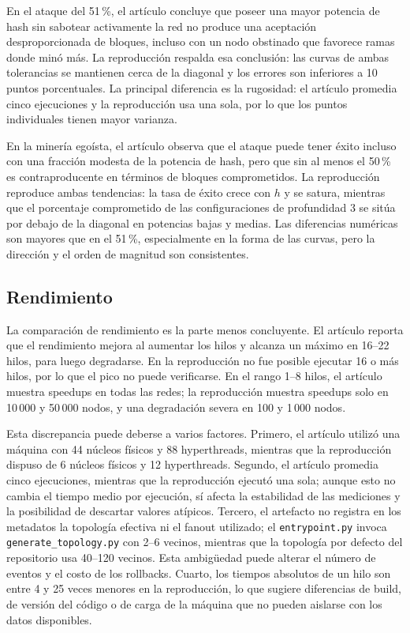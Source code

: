 \documentclass[11pt,a4paper,oneside]{article}
\begin{document}
En el ataque del 51\,\%, el artículo concluye que poseer una mayor potencia de hash sin sabotear activamente la red no produce una aceptación desproporcionada de bloques, incluso con un nodo obstinado que favorece ramas donde minó más. La reproducción respalda esa conclusión: las curvas de ambas tolerancias se mantienen cerca de la diagonal y los errores son inferiores a 10 puntos porcentuales. La principal diferencia es la rugosidad: el artículo promedia cinco ejecuciones y la reproducción usa una sola, por lo que los puntos individuales tienen mayor varianza.

En la minería egoísta, el artículo observa que el ataque puede tener éxito incluso con una fracción modesta de la potencia de hash, pero que sin al menos el 50\,\% es contraproducente en términos de bloques comprometidos. La reproducción reproduce ambas tendencias: la tasa de éxito crece con $h$ y se satura, mientras que el porcentaje comprometido de las configuraciones de profundidad 3 se sitúa por debajo de la diagonal en potencias bajas y medias. Las diferencias numéricas son mayores que en el 51\,\%, especialmente en la forma de las curvas, pero la dirección y el orden de magnitud son consistentes.

\subsection{Rendimiento}

La comparación de rendimiento es la parte menos concluyente. El artículo reporta que el rendimiento mejora al aumentar los hilos y alcanza un máximo en 16--22 hilos, para luego degradarse. En la reproducción no fue posible ejecutar 16 o más hilos, por lo que el pico no puede verificarse. En el rango 1--8 hilos, el artículo muestra speedups en todas las redes; la reproducción muestra speedups solo en 10\,000 y 50\,000 nodos, y una degradación severa en 100 y 1\,000 nodos.

Esta discrepancia puede deberse a varios factores. Primero, el artículo utilizó una máquina con 44 núcleos físicos y 88 hyperthreads, mientras que la reproducción dispuso de 6 núcleos físicos y 12 hyperthreads. Segundo, el artículo promedia cinco ejecuciones, mientras que la reproducción ejecutó una sola; aunque esto no cambia el tiempo medio por ejecución, sí afecta la estabilidad de las mediciones y la posibilidad de descartar valores atípicos. Tercero, el artefacto no registra en los metadatos la topología efectiva ni el fanout utilizado; el \texttt{entrypoint.py} invoca \texttt{generate\_topology.py} con 2--6 vecinos, mientras que la topología por defecto del repositorio usa 40--120 vecinos. Esta ambigüedad puede alterar el número de eventos y el costo de los rollbacks. Cuarto, los tiempos absolutos de un hilo son entre 4 y 25 veces menores en la reproducción, lo que sugiere diferencias de build, de versión del código o de carga de la máquina que no pueden aislarse con los datos disponibles.
\end{document}
